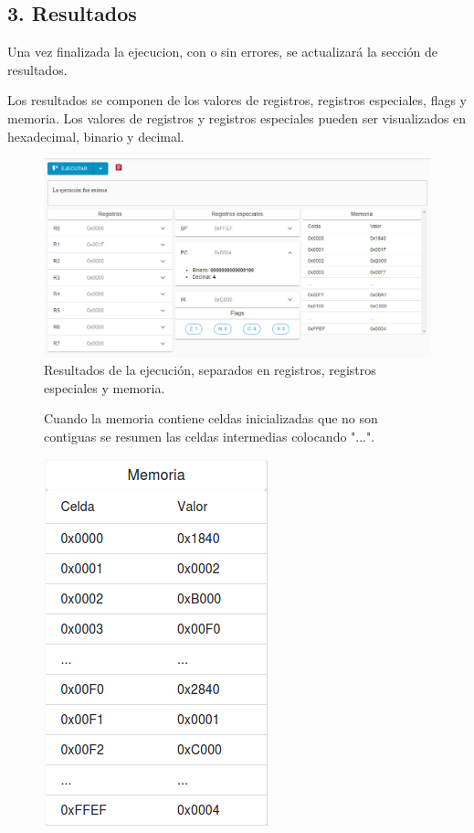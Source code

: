 \subsection*{3. Resultados}
Una vez finalizada la ejecucion, con o sin errores, se actualizará la sección de resultados.

Los resultados se componen de los valores de registros, registros especiales, flags y memoria. Los valores de registros y registros especiales pueden ser
visualizados en hexadecimal, binario y decimal.
\begin{figure}[H]
  \centering
  \includegraphics[width=14cm]{figuras/resultados.PNG}
  \caption{Resultados de la ejecución, separados en registros, registros especiales y memoria.}
  \label{fig:resultados}
\end{figure}

\begin{figure}[H]
  Cuando la memoria contiene celdas inicializadas que no son contiguas se resumen las celdas intermedias colocando "...".
  \begin{center}
    \includegraphics[scale=0.6]{./figuras/memoria_assemble.png}
  \end{center}
  \label{fig:memoria_assemble}
\end{figure}


